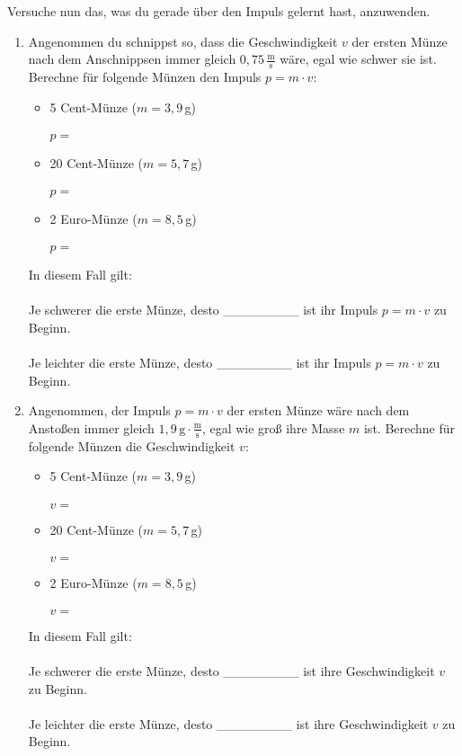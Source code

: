 \documentclass[task=1]{exercise}
\begin{document}
\newpage
  
  Versuche nun das, was du gerade \"uber den Impuls gelernt hast, anzuwenden.
  \begin{enumerate}[label=\textnormal{\roman*)}]
  \item
   Angenommen du schnippst so, dass die Geschwindigkeit $v$ der ersten M\"unze nach dem Anschnippsen immer gleich $0{,}75\,\frac{\mathrm{m}}{\mathrm{s}}$ w\"are, egal wie schwer sie ist.\\
   Berechne f\"ur folgende M\"unzen den Impuls $p = m\cdot v$:
   \begin{itemize}
    \item 5 Cent-M\"unze ($m = 3{,}9\,$g)\\~\\$p=$\\
    \item 20 Cent-M\"unze ($m = 5{,}7\,$g)\\~\\$p=$\\
    \item 2 Euro-M\"unze ($m = 8{,}5\,$g)\\~\\$p=$\\
   \end{itemize}
   In diesem Fall gilt:\\~\\
   Je schwerer die erste M\"unze, desto \_\_\_\_\_\_\_\_ ist ihr Impuls $p = m\cdot v$ zu Beginn.\\~\\
   Je leichter die erste M\"unze, desto \_\_\_\_\_\_\_\_ ist ihr Impuls $p = m\cdot v$ zu Beginn.
   \item
   Angenommen, der Impuls $p = m\cdot v$ der ersten M\"unze w\"are nach dem Ansto{\ss}en immer gleich $1{,}9\,\mathrm{g}\cdot\frac{\mathrm{m}}{\mathrm{s}}$, egal wie gro{\ss} ihre Masse $m$ ist.
   Berechne f\"ur folgende M\"unzen die Geschwindigkeit $v$:
   \begin{itemize}
    \item 5 Cent-M\"unze ($m = 3{,}9\,$g)\\~\\$v=$\\
    \item 20 Cent-M\"unze ($m = 5{,}7\,$g)\\~\\$v=$\\
    \item 2 Euro-M\"unze ($m = 8{,}5\,$g)\\~\\$v=$\\
   \end{itemize}
   In diesem Fall gilt:\\~\\
   Je schwerer die erste M\"unze, desto \_\_\_\_\_\_\_\_ ist ihre Geschwindigkeit $v$ zu Beginn.\\~\\
   Je leichter die erste M\"unze, desto \_\_\_\_\_\_\_\_ ist ihre Geschwindigkeit $v$ zu Beginn.
   \end{enumerate}
\end{document}

